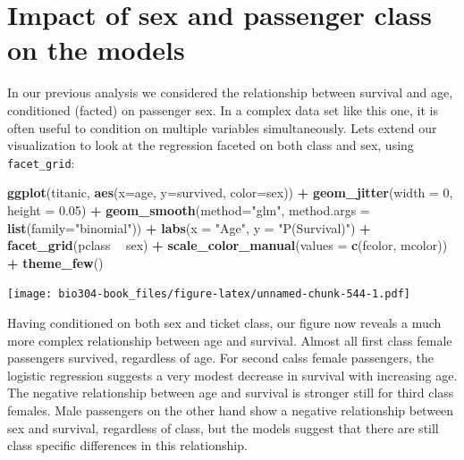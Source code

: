 \documentclass[]{book}
\newenvironment{Shaded}{\begin{snugshade}}{\end{snugshade}}
\newcommand{\DataTypeTok}[1]{\textcolor[rgb]{0.13,0.29,0.53}{#1}}
\newcommand{\DecValTok}[1]{\textcolor[rgb]{0.00,0.00,0.81}{#1}}
\newcommand{\FloatTok}[1]{\textcolor[rgb]{0.00,0.00,0.81}{#1}}
\newcommand{\KeywordTok}[1]{\textcolor[rgb]{0.13,0.29,0.53}{\textbf{#1}}}
\newcommand{\NormalTok}[1]{#1}
\newcommand{\OperatorTok}[1]{\textcolor[rgb]{0.81,0.36,0.00}{\textbf{#1}}}
\newcommand{\StringTok}[1]{\textcolor[rgb]{0.31,0.60,0.02}{#1}}
\theoremstyle{definition}
\theoremstyle{definition}
\theoremstyle{definition}
\theoremstyle{remark}
\begin{document}
\hypertarget{impact-of-sex-and-passenger-class-on-the-models}{%
\section{Impact of sex and passenger class on the
models}\label{impact-of-sex-and-passenger-class-on-the-models}}

In our previous analysis we considered the relationship between survival
and age, conditioned (facted) on passenger sex. In a complex data set
like this one, it is often useful to condition on multiple variables
simultaneously. Lets extend our visualization to look at the regression
faceted on both class and sex, using \texttt{facet\_grid}:

\begin{Shaded}
\begin{Highlighting}[]
\KeywordTok{ggplot}\NormalTok{(titanic, }\KeywordTok{aes}\NormalTok{(}\DataTypeTok{x=}\NormalTok{age, }\DataTypeTok{y=}\NormalTok{survived, }\DataTypeTok{color=}\NormalTok{sex)) }\OperatorTok{+}\StringTok{ }
\StringTok{  }\KeywordTok{geom_jitter}\NormalTok{(}\DataTypeTok{width =} \DecValTok{0}\NormalTok{, }\DataTypeTok{height =} \FloatTok{0.05}\NormalTok{) }\OperatorTok{+}
\StringTok{  }\KeywordTok{geom_smooth}\NormalTok{(}\DataTypeTok{method=}\StringTok{"glm"}\NormalTok{,  }\DataTypeTok{method.args =} \KeywordTok{list}\NormalTok{(}\DataTypeTok{family=}\StringTok{"binomial"}\NormalTok{))  }\OperatorTok{+}\StringTok{ }
\StringTok{  }\KeywordTok{labs}\NormalTok{(}\DataTypeTok{x =} \StringTok{"Age"}\NormalTok{, }\DataTypeTok{y =} \StringTok{"P(Survival)"}\NormalTok{) }\OperatorTok{+}\StringTok{  }
\StringTok{  }\KeywordTok{facet_grid}\NormalTok{(pclass }\OperatorTok{~}\StringTok{ }\NormalTok{sex) }\OperatorTok{+}
\StringTok{  }\KeywordTok{scale_color_manual}\NormalTok{(}\DataTypeTok{values =} \KeywordTok{c}\NormalTok{(fcolor, mcolor)) }\OperatorTok{+}\StringTok{ }
\StringTok{  }\KeywordTok{theme_few}\NormalTok{()}
\end{Highlighting}
\end{Shaded}

\texttt{[image: bio304-book\_files/figure-latex/unnamed-chunk-544-1.pdf]}

Having conditioned on both sex and ticket class, our figure now reveals
a much more complex relationship between age and survival. Almost all
first class female passengers survived, regardless of age. For second
calss female passengers, the logistic regression suggests a very modest
decrease in survival with increasing age. The negative relationship
between age and survival is stronger still for third class females. Male
passengers on the other hand show a negative relationship between sex
and survival, regardless of class, but the models suggest that there are
still class specific differences in this relationship.
\end{document}
